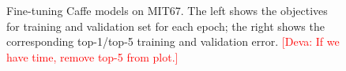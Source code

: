 \documentclass[10pt,twocolumn,letterpaper]{article}
\newcommand{\deva}[1]{\textcolor{red}{[Deva: #1]}}
\begin{document}
\begin{figure}
\centering

\caption{Fine-tuning Caffe models on MIT67. The left shows the objectives for training and validation set for each epoch; the right shows the corresponding top-1/top-5 training and validation error. \deva{If we have time, remove top-5 from plot.}}
\label{fig:ft_curve}
\end{figure}


\end{document}
